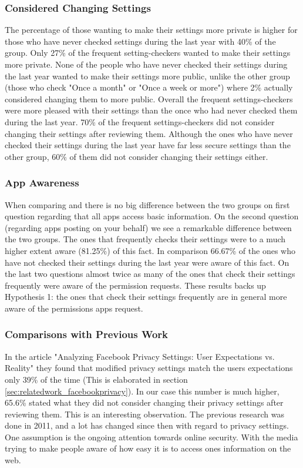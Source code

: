 \subsubsection{Considered Changing Settings}
The percentage of those wanting to make their settings more private is higher for those who have never checked settings during the last year with 40\% of the group. Only 27\% of the frequent setting-checkers wanted to make their settings more private. 
None of the people who have never checked their settings during the last year wanted to make their settings more public, unlike the other group (those who check "Once a month" or "Once a week or more") where 2\% actually considered changing them to more public. Overall the frequent settings-checkers were more pleased with their settings than the once who had never checked them during the last year. 70\% of the frequent settings-checkers did not consider changing their settings after reviewing them. Although the ones who have never checked their settings during the last year have far less secure settings than the other group, 60\% of them did not consider changing their settings either. 

\subsubsection{App Awareness}
When comparing  and  there is no big difference between the two groups on first question regarding that all apps access basic information. On the second question (regarding apps posting on your behalf) we see a remarkable difference between the two groups. The ones that frequently checks their settings were to a much higher extent aware (81.25\%) of this fact. In comparison 66.67\% of the ones who have not checked their settings during the last year were aware of this fact. On the last two questions almost twice as many of the ones that check their settings frequently were aware of the permission requests. These results backs up Hypothesis 1: the ones that check their settings frequently are in general more aware of the permissions apps request.

\subsubsection{Comparisons with Previous Work} 
In the article "Analyzing Facebook Privacy Settings: User Expectations vs. Reality" \cite{expectations} they found that modified privacy settings match the users expectations only 39\% of the time (This is elaborated in section \ref{sec:relatedwork_facebookprivacy}). In our case this number is much higher, 65.6\% stated what they did not consider changing their privacy settings after reviewing them. This is an interesting observation. The previous research was done in 2011, and a lot has changed since then with regard to privacy settings. One assumption is the ongoing attention towards online security. With the media trying to make people aware of how easy it is to access ones information on the web. 

